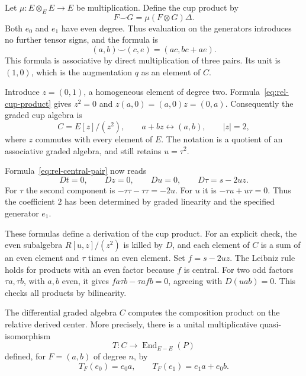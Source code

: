 Let $\mu:E\otimes_E E\to E$ be multiplication.
Define the cup product by
\[
 F\smile G=\mu(F\otimes G)\Delta.
\]
Both $e_0$ and $e_1$ have even degree. Thus evaluation on the generators
introduces no further tensor signs, and the formula is
\begin{equation}\label{eq:rel-cup-product}
 (a,b)\smile(c,e)=(ac,bc+ae).
\end{equation}
This formula is associative by direct multiplication of three pairs.
Its unit is $(1,0)$, which is the augmentation $q$ as an element of $C$.

Introduce $z=(0,1)$, a homogeneous element of degree two.
Formula~\eqref{eq:rel-cup-product} gives $z^2=0$ and
$z(a,0)=(a,0)z=(0,a)$.
Consequently the graded cup algebra is
\[
 C=E[z]/(z^2),\qquad a+bz\longleftrightarrow(a,b),\qquad |z|=2,
\]
where $z$ commutes with every element of $E$.
The notation is a quotient of an associative graded algebra, and still
retains $u=\tau^2$.

Formula~\eqref{eq:rel-central-pair} now reads
\begin{equation}\label{eq:rel-central-model}
 Dt=0,\qquad Dz=0,\qquad Du=0,\qquad D\tau=s-2uz.
\end{equation}
For $\tau$ the second component is
$-\tau\tau-\tau\tau=-2u$.
For $u$ it is $-\tau u+u\tau=0$.
Thus the coefficient $2$ has been determined by graded linearity and the
specified generator $e_1$.

These formulas define a derivation of the cup product.
For an explicit check, the even subalgebra $R[u,z]/(z^2)$ is killed by
$D$, and each element of $C$ is a sum of an even element and $\tau$
times an even element. Set $f=s-2uz$.
The Leibniz rule holds for products with an even factor because $f$ is
central. For two odd factors $\tau a,\tau b$, with $a,b$ even, it gives
$fa\tau b-\tau afb=0$, agreeing with $D(uab)=0$.
This checks all products by bilinearity.

\begin{proposition}\label{prop:rel-composition}
The differential graded algebra $C$ computes the composition product on
the relative derived center. More precisely, there is a unital
multiplicative quasi-isomorphism
\[
 T:C\longrightarrow\operatorname{End}_{E-E}(P)
\]
defined, for $F=(a,b)$ of degree $n$, by
\[
 T_F(e_0)=e_0a,\qquad T_F(e_1)=e_1a+e_0b.
\]
\end{proposition}

